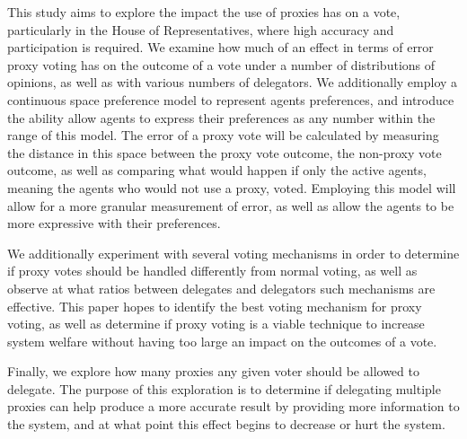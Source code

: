 This study aims to explore the impact the use of proxies has on a vote,
particularly in the House of Representatives, where high accuracy and participation
is required.
We examine how much of an effect in terms of error proxy voting has on the outcome
of a vote under a number of distributions of opinions, as well as with various
numbers of delegators.
We additionally employ a continuous space preference model to represent agents
preferences, and introduce the ability allow agents to express their preferences as
any number within the range of this model.
The error of a proxy vote will be calculated by measuring the distance in this space
between the proxy vote outcome, the non-proxy vote outcome, as well as comparing what
would happen if only the active agents, meaning the agents who would not use a
proxy, voted.
Employing this model will allow for a more granular measurement of error, as well as
allow the agents to be more expressive with their preferences.

We additionally experiment with several voting mechanisms in order to determine if
proxy votes should be handled differently from normal voting, as well as observe at
what ratios between delegates and delegators such mechanisms are effective.
This paper hopes to identify the best voting mechanism for proxy voting, as well as
determine if proxy voting is a viable technique to increase system welfare without
having too large an impact on the outcomes of a vote.

Finally, we explore how many proxies any given voter should be allowed to delegate.
The purpose of this exploration is to determine if delegating multiple proxies can
help produce a more accurate result by providing more information to the system, and
at what point this effect begins to decrease or hurt the system.

